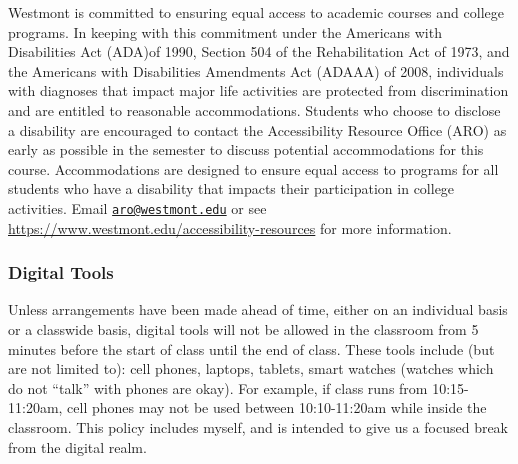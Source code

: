 \documentclass[
  twoside]{article}
\begin{document}
Westmont is committed to ensuring equal access to academic courses and
college programs. In keeping with this commitment under the Americans
with Disabilities Act (ADA)of 1990, Section 504 of the Rehabilitation
Act of 1973, and the Americans with Disabilities Amendments Act (ADAAA)
of 2008, individuals with diagnoses that impact major life activities
are protected from discrimination and are entitled to reasonable
accommodations. Students who choose to disclose a disability are
encouraged to contact the Accessibility Resource Office (ARO) as early
as possible in the semester to discuss potential accommodations for this
course. Accommodations are designed to ensure equal access to programs
for all students who have a disability that impacts their participation
in college activities. Email
\href{mailto:aro@westmont.edu}{\nolinkurl{aro@westmont.edu}} or see
\url{https://www.westmont.edu/accessibility-resources} for more
information.

\subsubsection{Digital Tools}\label{digital-tools}

Unless arrangements have been made ahead of time, either on an
individual basis or a classwide basis, digital tools will not be allowed
in the classroom from 5 minutes before the start of class until the end
of class. These tools include (but are not limited to): cell phones,
laptops, tablets, smart watches (watches which do not ``talk'' with
phones are okay). For example, if class runs from 10:15-11:20am, cell
phones may not be used between 10:10-11:20am while inside the classroom.
This policy includes myself, and is intended to give us a focused break
from the digital realm.
\end{document}
